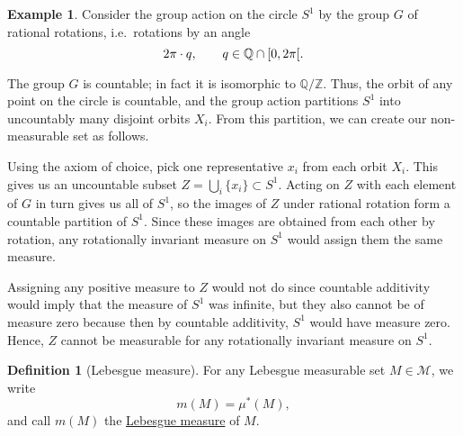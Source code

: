 \documentclass[a4paper,12pt]{scrreprt}
\newcommand{\Z}{\mathbb{Z}}
\newcommand{\Q}{\mathbb{Q}}
\newcommand{\defn}[1]{\ul{#1}}
\theoremstyle{definition}
\newtheorem{definition}{Definition}[section]
\newtheorem{example}{Example}[section]
\theoremstyle{plain}
\theoremstyle{remark}
\begin{document}
\begin{example}
  Consider the group action on the circle $S^{1}$ by the group $G$ of rational rotations, i.e.\ rotations by an angle
  \begin{equation*}
    2\pi \cdot q,\qquad q \in \Q \cap \interval[open right]{0}{2\pi}.
  \end{equation*}

  The group $G$ is countable; in fact it is isomorphic to $\Q/\Z$. Thus, the orbit of any point on the circle is countable, and the group action partitions $S^{1}$ into uncountably many disjoint orbits $X_{i}$. From this partition, we can create our non-measurable set as follows.

  Using the axiom of choice, pick one representative $x_{i}$ from each orbit $X_{i}$. This gives us an uncountable subset $Z = \bigcup_{i} \{ x_{i} \} \subset S^{1}$. Acting on $Z$ with each element of $G$ in turn gives us all of $S^{1}$, so the images of $Z$ under rational rotation form a countable partition of $S^{1}$. Since these images are obtained from each other by rotation, any rotationally invariant measure on $S^{1}$ would assign them the same measure.

  Assigning any positive measure to $Z$ would not do since countable additivity would imply that the measure of $S^{1}$ was infinite, but they also cannot be of measure zero because then by countable additivity, $S^{1}$ would have measure zero. Hence, $Z$ cannot be measurable for any rotationally invariant measure on $S^{1}$.
\end{example}

\begin{definition}[Lebesgue measure]
  \label{def:lebesguemeasure}
  For any Lebesgue measurable set $M \in \mathcal{M}$, we write
  \begin{equation*}
    m(M) = \mu^{*}(M),
  \end{equation*}
  and call $m(M)$ the \defn{Lebesgue measure} of $M$.
\end{definition}
\end{document}
